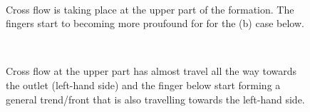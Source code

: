 \documentclass[preprint,authoryear,12pt]{elsarticle}
\begin{document}
\begin{figure}
\centering
{}\\[2mm]%
%
\caption{Cross flow is taking place at the upper part of the formation. The fingers start to becoming more proufound for for the (b) case below.}
\label{fig:2testcase_b}
\end{figure}

\begin{figure}
\centering
{}\\[2mm]%
%
\caption{Cross flow at the upper part has almost travel all the way towards the outlet (left-hand side) and the finger below start forming a general trend/front that is also travelling towards the left-hand side.}
\label{fig:2testcase_c}
\end{figure}
\end{document}
